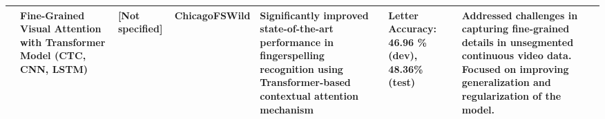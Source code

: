 \begin{longtable}{p{}p{}p{}p{}p{}p{}p{}}
    \cite{gajurelFineGrainedVisualAttention2021}       & Fine-Grained Visual Attention with Transformer Model (CTC, CNN, LSTM)                                                 & [Not specified]          & ChicagoFSWild                  & Significantly improved state-of-the-art performance in fingerspelling recognition using Transformer-based contextual attention mechanism                  & Letter Accuracy: 46.96 \% (dev), 48.36\% (test)        & Addressed challenges in capturing fine-grained details in unsegmented continuous video data. Focused on improving generalization and regularization of the model.       \\

    \bottomrule
\end{longtable}